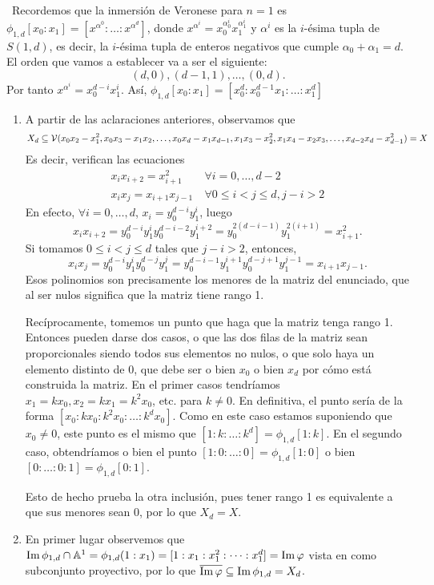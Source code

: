 \documentclass[twoside]{article}
\begin{document}
\begin{solucion}\
Recordemos que la inmersión de Veronese para $n=1$ es $\phi_{1,d}[x_0:x_1]=[x^{\alpha^0}:\dots:x^{\alpha^d}]$, donde $x^{\alpha^i}=x_0^{\alpha^i_0}x_1^{\alpha^i_1}$ y $\alpha^i$ es la $i$-ésima tupla de $S(1,d)$, es decir, la $i$-ésima tupla de enteros negativos que cumple $\alpha_0+\alpha_1=d$. El orden que vamos a establecer va a ser el siguiente: $$(d,0),(d-1,1),\dots, (0,d).$$
Por tanto $x^{\alpha^i}=x_0^{d-i}x_1^i$. Así, $\phi_{1,d}[x_0:x_1]=[x_0^d:x_0^{d-1}x_1:\dots:x_1^d]$
\begin{enumerate}
\item A partir de las aclaraciones anteriores, observamos que $$X_d\subseteq\mathcal{V}(x_0x_2-x_1^2,x_0x_3-x_1x_2,\dots, x_0x_d-x_1x_{d-1},x_1x_3-x_2^2,x_1x_4-x_2x_3,\dots, x_{d-2}x_d-x_{d-1}^2)=X$$
Es decir, verifican las ecuaciones
\begin{align*}
x_ix_{i+2}=x_{i+1}^2\ &\forall i=0,\dots,d-2\\
x_ix_j=x_{i+1}x_{j-1}\ &\forall 0\leq i< j\leq d, j-i>2
\end{align*}
En efecto, $\forall i=0,\dots,d$, $x_i=y_0^{d-i}y_1^i$, luego $$x_ix_{i+2}=y_0^{d-i}y_1^iy_0^{d-i-2}y_1^{i+2}=y_0^{2(d-i-1)}y_1^{2(i+1)}=x_{i+1}^2.$$ Si tomamos $0\leq i<j\leq d$ tales que $j-i>2$, entonces, $$x_ix_{j}=y_0^{d-i}y_1^iy_0^{d-j}y_1^{j}=y_0^{d-i-1}y_1^{i+1}y_0^{d-j+1}y_1^{j-1}=x_{i+1}x_{j-1}.$$
Esos polinomios son precisamente los menores de la matriz del enunciado, que al ser nulos significa que la matriz tiene rango 1.

Recíprocamente, tomemos un punto que haga que la matriz tenga rango 1. Entonces pueden darse dos casos, o que las dos filas de la matriz sean proporcionales siendo todos sus elementos no nulos, o que solo haya un elemento distinto de 0, que debe ser o bien $x_0$ o bien $x_d$ por cómo está construida la matriz. En el primer casos tendríamos $x_1=kx_0, x_2=kx_1=k^2x_0$, etc. para $k\neq 0$. En definitiva, el punto sería de la forma $[x_0:kx_0:k^2x_0:\dots:k^dx_0]$. Como en este caso estamos suponiendo que $x_0\neq 0$, este punto es el mismo que $[1:k:\dots:k^d]=\phi_{1,d}[1:k]$. En el segundo caso, obtendríamos o bien el punto $[1:0:\dots:0]=\phi_{1,d}[1:0]$ o bien $[0:\dots:0:1]=\phi_{1,d}[0:1].$

Esto de hecho prueba la otra inclusión, pues tener rango 1 es equivalente a que sus menores sean 0, por lo que $X_d=X$.

\item En primer lugar observemos que $\operatorname{Im}{\phi_{1,d}}\cap\mathbb{A}^1=\phi_{1,d}(1:x_1)=[1:x_1:x_1^2:\dots:x_1^d]=\operatorname{Im}{\varphi}$ vista en como subconjunto proyectivo, por lo que $\overline{\operatorname{Im}{\varphi}}\subseteq \operatorname{Im}{\phi_{1,d}}=X_d$. 


\end{enumerate}
\end{solucion}
\end{document}
